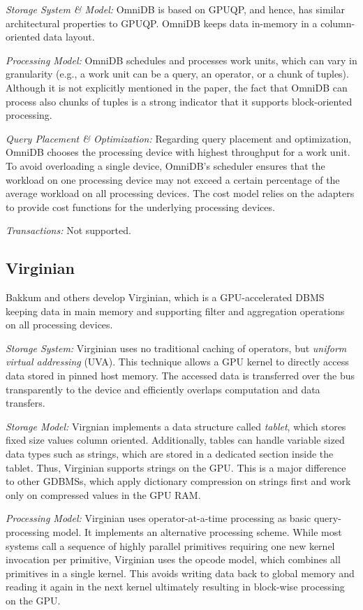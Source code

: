 \documentclass[twocolumn]{article}
\begin{document}
\noindent
\textit{Storage System \& Model:} 
OmniDB is based on GPUQP, and hence, has similar architectural properties to GPUQP. 
OmniDB keeps data in-memory in a column- oriented data layout.

\noindent
\textit{Processing Model:} 
OmniDB schedules and processes work units, which can vary in granularity (e.g., a work unit can be a query, an operator, or a chunk of tuples). Although it is not explicitly mentioned in the paper, the fact that OmniDB can process also chunks of tuples is a strong indicator that it supports block-oriented processing.

\noindent
\textit{Query Placement \& Optimization:} 
Regarding query placement and optimization, OmniDB chooses the processing device with highest throughput for a work unit. To avoid overloading a single device, OmniDB’s scheduler ensures that the workload on one processing device may not exceed a certain percentage of the average workload on all processing devices. The cost model relies on the adapters to provide cost functions for the underlying processing devices.

\noindent
\textit{Transactions:} Not supported.

\subsection{Virginian}
Bakkum and others develop Virginian, which is a GPU-accelerated DBMS keeping data in main memory and supporting filter and aggregation operations on all processing devices.

\noindent
\textit{Storage System:} 
Virginian uses no traditional caching of operators, but \textit{uniform virtual addressing} (UVA). This technique allows a GPU kernel to directly access data stored in pinned host memory. The accessed data is transferred over the bus transparently to the device and efficiently overlaps computation and data transfers.

\noindent
\textit{Storage Model:} 
Virgnian implements a data structure called \textit{tablet}, which stores fixed size values column oriented. Additionally, tables can handle variable sized data types such as strings, which are stored in a dedicated section inside the tablet. Thus, Virginian supports strings on the GPU. This is a major difference to other GDBMSs, which apply dictionary compression on strings first and work only on compressed values in the GPU RAM.

\noindent
\textit{Processing Model:} Virginian uses operator-at-a-time processing as basic query- processing model. It implements an alternative processing scheme. While most systems call a sequence of highly parallel primitives requiring one new kernel invocation per primitive, Virginian uses the opcode model, which combines all primitives in a single kernel. This avoids writing data back to global memory and reading it again in the next kernel ultimately resulting in block-wise processing on the GPU.
\end{document}
